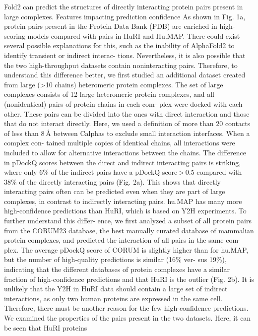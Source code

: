 Fold2 can predict the structures of directly interacting protein pairs
present in large complexes.
Features impacting prediction confidence
As shown in Fig. 1a, protein pairs present in the Protein Data Bank (PDB)
are enriched in high-scoring models compared with pairs in HuRI and
Hu.MAP. There could exist several possible explanations for this, such
as the inability of AlphaFold2 to identify transient or indirect interac-
tions. Nevertheless, it is also possible that the two high-throughput
datasets contain noninteracting pairs. Therefore, to understand this
difference better, we first studied an additional dataset created from
large (>10 chains) heteromeric protein complexes.
The set of large complexes consists of 12 large heteromeric protein
complexes, and all (nonidentical) pairs of protein chains in each com-
plex were docked with each other. These pairs can be divided into the
ones with direct interaction and those that do not interact directly. Here,
we used a definition of more than 20 contacts of less than 8 Å between
Calphas to exclude small interaction interfaces. When a complex con-
tained multiple copies of identical chains, all interactions were included
to allow for alternative interactions between the chains. The difference
in pDockQ scores between the direct and indirect interacting pairs is
striking, where only 6\% of the indirect pairs have a pDockQ score > 0.5
compared with 38\% of the directly interacting pairs (Fig. 2a). This shows
that directly interacting pairs often can be predicted even when they
are part of large complexes, in contrast to indirectly interacting pairs.
hu.MAP has many more high-confidence predictions than HuRI,
which is based on Y2H experiments. To further understand this differ-
ence, we first analyzed a subset of all protein pairs from the CORUM23
database, the best manually curated database of mammalian protein
complexes, and predicted the interaction of all pairs in the same com-
plex. The average pDockQ score of CORUM is slightly higher than for
hu.MAP, but the number of high-quality predictions is similar (16\% ver-
sus 19\%), indicating that the different databases of protein complexes
have a similar fraction of high-confidence predictions and that HuRI
is the outlier (Fig. 2b).
It is unlikely that the Y2H in HuRI data should contain a large set
of indirect interactions, as only two human proteins are expressed
in the same cell. Therefore, there must be another reason for the few
high-confidence predictions. We examined the properties of the pairs
present in the two datasets. Here, it can be seen that HuRI proteins
